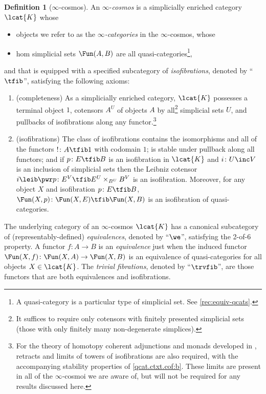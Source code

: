 \documentclass[12pt,reqno]{amsart}
\theoremstyle{plain}
\theoremstyle{definition}
\newtheorem{defn}[thm]{Definition}
\theoremstyle{remark}
\numberwithin{equation}{subsection}
\begin{document}
\begin{defn}[$\infty$-cosmos]\label{qcat.ctxt.cof.def}
An $\infty$-\emph{cosmos} is a simplicially enriched category $\lcat{K}$ whose 
\begin{itemize}
\item objects we refer to as the \emph{$\infty$-categories} in the $\infty$-cosmos, whose
\item hom simplicial sets $\Fun(A,B)$ are all  quasi-categories\footnote{A quasi-category is a particular type of simplicial set. See \ref{rec:equiv-qcats}.}, 
\end{itemize} and that is equipped with a specified subcategory of \emph{isofibrations}, denoted by ``$\tfib$'',
satisfying the following axioms:
 \begin{enumerate}[label=(\alph*)]
    \item\label{qcat.ctxt.cof:a} (completeness) As a simplicially enriched category,  $\lcat{K}$ possesses a terminal object $1$, cotensors $A^U$ of  objects $A$ by all\footnote{It suffices to require only cotensors with finitely presented simplicial sets (those with only finitely many non-degenerate simplices).} simplicial sets $U$, and pullbacks of isofibrations along any functor.\footnote{For the theory of homotopy coherent adjunctions and monads developed in \cite{RiehlVerity:2012hc}, retracts and limits of towers of isofibrations are also required, with the accompanying stability properties of \ref{qcat.ctxt.cof:b}. These limits are present in all of the $\infty$-cosmoi we are aware of, but will not be required for any results discussed here.}
    \item\label{qcat.ctxt.cof:b} (isofibrations) The class of isofibrations contains the isomorphisms and all of the functors $!\colon A \tfib 1$ with codomain $1$; is stable under pullback along all functors; and if $p\colon E\tfib B$ is an isofibration in $\lcat{K}$ and $i\colon U\inc V$ is an inclusion of  simplicial sets then the Leibniz cotensor $i\leib\pwr p\colon E^V\tfib E^U\times_{B^U} B^V$ is an isofibration. Moreover, for any object $X$ and isofibration $p \colon E \tfib B$, $\Fun(X,p) \colon \Fun(X,E) \tfib \Fun(X,B)$ is an isofibration of quasi-categories.
\end{enumerate}
The underlying category of an $\infty$-cosmos $\lcat{K}$ has a canonical subcategory of (representably-defined) \emph{equivalences}, denoted by ``$\we$'', satisfying the 2-of-6 property. A functor $f \colon A \to B$ is an \emph{equivalence} just when the induced functor $\Fun(X,f) \colon \Fun(X,A) \to \Fun(X,B)$ is an equivalence of quasi-categories for all objects $X \in \lcat{K}$.  The  \emph{trivial fibrations}, denoted by ``$\trvfib$'', are those functors that are both equivalences and isofibrations. 


\end{defn}
\end{document}
